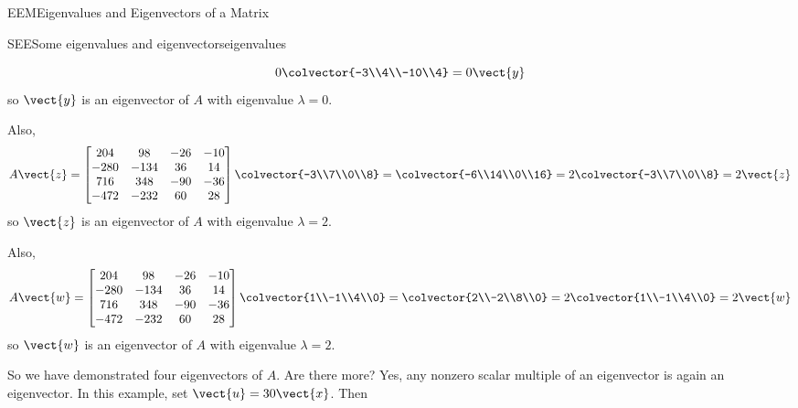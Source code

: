 \begin{subsect}{EEM}{Eigenvalues and Eigenvectors of a Matrix}
\begin{example}{SEE}{Some eigenvalues and eigenvectors}{eigenvalues}
\begin{para}
\begin{equation*}
0\colvector{-3\\4\\-10\\4}=0\vect{y}
%
\end{equation*}
%
so $\vect{y}$ is an eigenvector of $A$ with eigenvalue $\lambda=0$.\end{para}
%
\begin{para}Also,
%
\begin{equation*}
A\vect{z}=
\begin{bmatrix}
204 & 98 & -26 & -10\\
-280 & -134 & 36 & 14\\
716 & 348 & -90 & -36\\
-472 & -232 & 60 & 28
\end{bmatrix}
\colvector{-3\\7\\0\\8}=
\colvector{-6\\14\\0\\16}=
2\colvector{-3\\7\\0\\8}=2\vect{z}
\end{equation*}
%
so $\vect{z}$ is an eigenvector of $A$ with eigenvalue $\lambda=2$.\end{para}
%
\begin{para}Also,
%
\begin{equation*}
A\vect{w}=
\begin{bmatrix}
204 & 98 & -26 & -10\\
-280 & -134 & 36 & 14\\
716 & 348 & -90 & -36\\
-472 & -232 & 60 & 28
\end{bmatrix}
\colvector{1\\-1\\4\\0}=
\colvector{2\\-2\\8\\0}=
2\colvector{1\\-1\\4\\0}=2\vect{w}
\end{equation*}
%
so $\vect{w}$ is an eigenvector of $A$ with eigenvalue $\lambda=2$.\end{para}
%
\begin{para}So we have demonstrated four eigenvectors of $A$.  Are there more?  Yes, any nonzero scalar multiple of an eigenvector is again an eigenvector.  In this example, set $\vect{u}=30\vect{x}$.  Then

\end{para}
\end{example}
\end{subsect}
